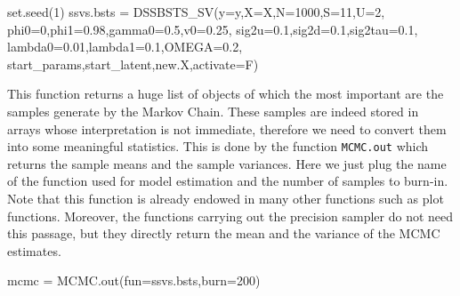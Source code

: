 \documentclass[
  12pt,
]{book}
\newenvironment{Shaded}{\begin{snugshade}}{\end{snugshade}}
\newcommand{\AttributeTok}[1]{\textcolor[rgb]{0.77,0.63,0.00}{#1}}
\newcommand{\DecValTok}[1]{\textcolor[rgb]{0.00,0.00,0.81}{#1}}
\newcommand{\FloatTok}[1]{\textcolor[rgb]{0.00,0.00,0.81}{#1}}
\newcommand{\FunctionTok}[1]{\textcolor[rgb]{0.00,0.00,0.00}{#1}}
\newcommand{\NormalTok}[1]{#1}
\newcommand{\OtherTok}[1]{\textcolor[rgb]{0.56,0.35,0.01}{#1}}
\theoremstyle{break}
\theoremstyle{nonumberplain}
\begin{document}
\begin{Shaded}
\begin{Highlighting}[]
\FunctionTok{set.seed}\NormalTok{(}\DecValTok{1}\NormalTok{)}
\NormalTok{ssvs.bsts }\OtherTok{=} \FunctionTok{DSSBSTS\_SV}\NormalTok{(}\AttributeTok{y=}\NormalTok{y,}\AttributeTok{X=}\NormalTok{X,}\AttributeTok{N=}\DecValTok{1000}\NormalTok{,}\AttributeTok{S=}\DecValTok{11}\NormalTok{,}\AttributeTok{U=}\DecValTok{2}\NormalTok{,}
                     \AttributeTok{phi0=}\DecValTok{0}\NormalTok{,}\AttributeTok{phi1=}\FloatTok{0.98}\NormalTok{,}\AttributeTok{gamma0=}\FloatTok{0.5}\NormalTok{,}\AttributeTok{v0=}\FloatTok{0.25}\NormalTok{,}
                     \AttributeTok{sig2u=}\FloatTok{0.1}\NormalTok{,}\AttributeTok{sig2d=}\FloatTok{0.1}\NormalTok{,}\AttributeTok{sig2tau=}\FloatTok{0.1}\NormalTok{,}
                     \AttributeTok{lambda0=}\FloatTok{0.01}\NormalTok{,}\AttributeTok{lambda1=}\FloatTok{0.1}\NormalTok{,}\AttributeTok{OMEGA=}\FloatTok{0.2}\NormalTok{,}
\NormalTok{                     start\_params,start\_latent,new.X,}\AttributeTok{activate=}\NormalTok{F)}
\end{Highlighting}
\end{Shaded}

This function returns a huge list of objects of which the most important
are the samples generate by the Markov Chain. These samples are indeed
stored in arrays whose interpretation is not immediate, therefore we
need to convert them into some meaningful statistics. This is done by
the function \texttt{MCMC.out} which returns the sample means and the
sample variances. Here we just plug the name of the function used for
model estimation and the number of samples to burn-in. Note that this
function is already endowed in many other functions such as plot
functions. Moreover, the functions carrying out the precision sampler do
not need this passage, but they directly return the mean and the
variance of the MCMC estimates.

\begin{Shaded}
\begin{Highlighting}[]
\NormalTok{mcmc }\OtherTok{=} \FunctionTok{MCMC.out}\NormalTok{(}\AttributeTok{fun=}\NormalTok{ssvs.bsts,}\AttributeTok{burn=}\DecValTok{200}\NormalTok{)}
\end{Highlighting}
\end{Shaded}
\end{document}
